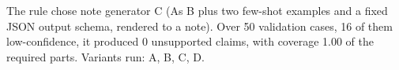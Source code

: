 The rule chose note generator C (As B plus two few-shot examples and a fixed JSON output schema, rendered to a note). Over 50 validation cases, 16 of them low-confidence, it produced 0 unsupported claims, with coverage 1.00 of the required parts. Variants run: A, B, C, D.
